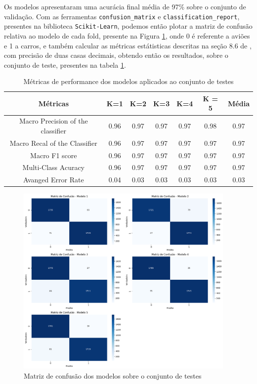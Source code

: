 \documentclass[]{abntex2}
\begin{document}
Os modelos apresentaram uma acurácia final média de 97\% sobre o conjunto de validação. Com as ferramentas \texttt{confusion\_matrix} e \texttt{classification\_report}, presentes na biblioteca \texttt{Scikit-Learn}, podemos então plotar a matriz de confusão relativa ao modelo de cada fold, presente na Figura \ref{fig:conf}, onde 0 é referente a aviões e 1 a carros, e também calcular as métricas estátisticas descritas na seção 8.6 de \cite{book}, com precisão de duas casas decimais, obtendo então os resultados, sobre o conjunto de teste, presentes na tabela \ref{tab:acu1}.

\begin{table}[H]
    \centering
    \begin{tabular}{|c|c|c|c|c|c|c|}
    \hline
    \rowcolor[HTML]{C0C0C0} 
    Métricas                          & K=1  & K=2  & K=3  & K=4  & K = 5 & Média \\ \hline
    Macro Precision of the classifier & 0.96 & 0.97 & 0.97 & 0.97 & 0.98 & 0.97  \\ \hline
    Macro Recal of the Classifier     & 0.96 & 0.97 & 0.97 & 0.97 & 0.97 & 0.97  \\ \hline
    Macro F1 score                    & 0.96 & 0.97 & 0.97 & 0.97 & 0.97 & 0.97  \\ \hline
    Multi-Class Acuracy               & 0.96 & 0.97 & 0.97 & 0.97 & 0.97 & 0.97  \\ \hline
    Avanged Error Rate                & 0.04 & 0.03 & 0.03 & 0.03 & 0.03 & 0.03  \\ \hline
    \end{tabular}
    \caption{Métricas de performance dos modelos aplicados ao conjunto de testes}
    \label{tab:acu1}
\end{table}

\begin{figure}[H]
    \centering 
    \includegraphics[width=0.95\textwidth]{imgs/ex2/confusion.png}
    \caption{Matriz de confusão dos modelos sobre o conjunto de testes}
    \label{fig:conf} %
\end{figure}
\end{document}
